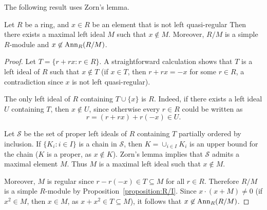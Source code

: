 
The following result uses Zorn's lemma. 

\begin{lemma}
	\label{lemma:maxreg}
	Let $R$ be a ring, and $x\in R$ be an element that is not left quasi-regular Then there
	exists a maximal left ideal $M$ such that 
	$x\not\in M$. Moreover, $R/M$ is a simple $R$-module and 
	$x\not\in\operatorname{Ann}_R(R/M)$.
\end{lemma}

\begin{proof}
	Let $T=\{r+rx:r\in R\}$. A straightforward calculation shows that $T$ is a left ideal of 
	$R$ such that $x\not\in T$ (if $x\in T$, then $r+rx=-x$ for some 
	$r\in R$, a contradiction since $x$ is not left quasi-regular). 

	The only left ideal of $R$ containing 
	$T\cup\{x\}$ is $R$. Indeed, if there exists a left ideal $U$ containing $T$, then 
    $x\not\in U$, since otherwise every $r\in R$ could be written as 
	\[
    r=(r+rx)+r(-x)\in U.
    \]

	Let $\mathcal{S}$ be the set of proper left ideals of $R$ containing 
	$T$ partially ordered by inclusion. If $\{K_i:i\in I\}$ is a chain in 
	$\mathcal{S}$, then $K=\cup_{i\in I}K_i$ is an upper bound for the chain 
	($K$ is a proper, as $x\not\in K$). Zorn's lemma implies that 
	$\mathcal{S}$ admits a maximal element $M$. Thus $M$
	is a maximal left ideal such that $x\not\in M$.
 
        Moreover, $M$ is regular
	since $r-r(-x)\in T\subseteq M$ for all $r\in R$. Therefore $R/M$ is a simple 
	$R$-module by Proposition~\ref{proposition:R/I}. Since $x\cdot (x+M)\ne
	0$ (if $x^2\in M$, then  $x\in M$, as $x+x^2\in
	T\subseteq M$), it follows that $x\not\in\operatorname{Ann}_R(R/M)$.
\end{proof}

